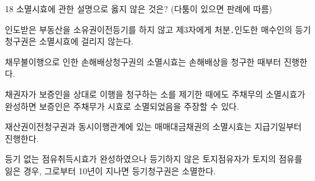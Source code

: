 \begin{question}{18}
소멸시효에 관한 설명으로 옳지 않은 것은? (다툼이 있으면 판례에 따름)
\begin{choices}
  \item 인도받은 부동산을 소유권이전등기를 하지 않고 제3자에게 처분․인도한 매수인의 등기청구권은 소멸시효에 걸리지 않는다.
  \item 채무불이행으로 인한 손해배상청구권의 소멸시효는 손해배상을 청구한 때부터 진행한다.
  \item 채권자가 보증인을 상대로 이행을 청구하는 소를 제기한 때에도 주채무의 소멸시효가 완성하면 보증인은 주채무가 시효로 소멸되었음을 주장할 수 있다.
  \item 재산권이전청구권과 동시이행관계에 있는 매매대금채권의 소멸시효는 지급기일부터 진행한다.
  \item 등기 없는 점유취득시효가 완성하였으나 등기하지 않은 토지점유자가 토지의 점유를 잃은 경우, 그로부터 10년이 지나면 등기청구권은 소멸한다.
\end{choices}
\end{question}
